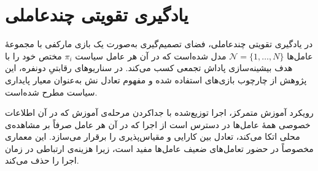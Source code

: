     
    \section{یادگیری تقویتی چندعاملی}\label{sec:marl}
    
    در یادگیری تقویتی چندعاملی،
     فضای تصمیم‌گیری به‌صورت یک بازی مارکفی
      با مجموعهٔ عامل‌ها
      {$\mathcal{N}=\{1,\dots,N\}$} 
      مدل شده‌است که در آن هر عامل سیاست {$\pi_i$} مختص خود را با هدف بیشینه‌سازی پاداش تجمعی کسب می‌کند. در سناریوهای رقابتیِ دونفره، این پژوهش از چارچوب بازی‌های   استفاده شده و مفهوم تعادل نش
       به‌عنوان معیار پایداری سیاست مطرح شده‌است.
    
    
    رویکرد آموزش متمرکز، اجرا توزیع‌شده
     با جداکردن مرحله‌ی آموزش که در آن اطلاعات خصوصی همهٔ عامل‌ها در دسترس است از اجرا که در آن هر عامل صرفاً بر مشاهده‌ی محلی اتکا می‌کند، تعادل بین کارایی و مقیاس‌پذیری را برقرار می‌سازد. این معماری مخصوصاً در حضور تعامل‌های ضعیف عامل‌ها مفید است، زیرا هزینه‌ی ارتباطی در زمان اجرا را حذف می‌کند.
    
%    
%    
    
